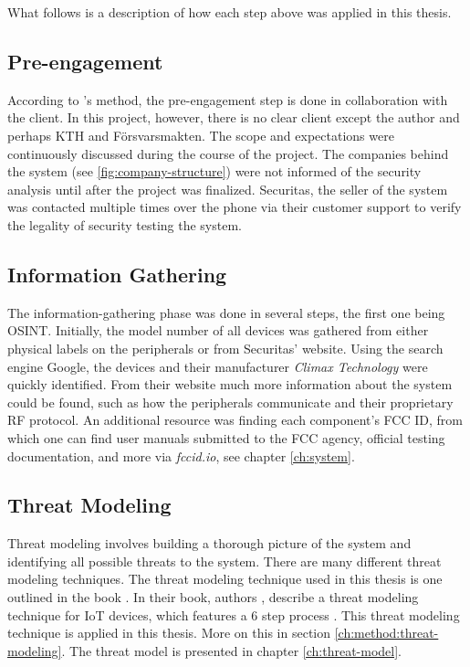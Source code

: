 What follows is a description of how each step above was applied in this thesis.

\subsection{Pre-engagement}
According to \citeauthor{weidman2014}'s method, the pre-engagement step is done in collaboration with the client. In this project, however, there is no clear client except the author and perhaps KTH and Försvarsmakten. The scope and expectations were continuously discussed during the course of the project. The companies behind the system (see \ref{fig:company-structure}) were not informed of the security analysis until after the project was finalized. Securitas, the seller of the system was contacted multiple times over the phone via their customer support to verify the legality of security testing the system.

\subsection{Information Gathering}
The information-gathering phase was done in several steps, the first one being \gls{OSINT}. Initially, the model number of all devices was gathered from either physical labels on the peripherals or from Securitas' website. Using the search engine Google, the devices and their manufacturer \textit{Climax Technology} were quickly identified. From their website much more information about the system could be found, such as how the peripherals communicate and their proprietary \gls{RF} protocol. An additional resource was finding each component's FCC ID, from which one can find user manuals submitted to the FCC agency, official testing documentation, and more via \textit{fccid.io}, see chapter \ref{ch:system}.

\subsection{Threat Modeling}
Threat modeling involves building a thorough picture of the system and identifying all possible threats to the system. There are many different threat modeling techniques. The threat modeling technique used in this thesis is one outlined in the book . In their book, authors \citeauthor{guzman2017iot}, describe a threat modeling technique for IoT devices, which features a 6 step process \cite{guzman2017iot}. This threat modeling technique is applied in this thesis. More on this in section \ref{ch:method:threat-modeling}. The threat model is presented in chapter \ref{ch:threat-model}.

